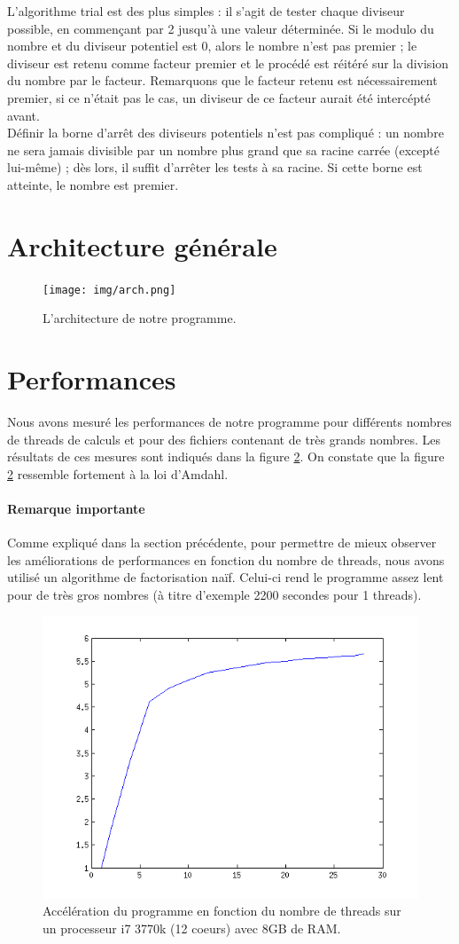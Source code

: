 \documentclass{article}
\begin{document}
L'algorithme trial est des plus simples : il s'agit de tester chaque diviseur possible, en commençant
par 2 jusqu'à une valeur déterminée. Si le modulo du nombre et du diviseur potentiel est 0, alors 
le nombre n'est pas premier ; le diviseur est retenu comme facteur premier et le procédé est réitéré
sur la division du nombre par le facteur. Remarquons que le facteur retenu est nécessairement premier,
si ce n'était pas le cas, un diviseur de ce facteur aurait été intercépté avant.\\

Définir la borne d'arrêt des diviseurs potentiels n'est pas compliqué : un nombre ne sera jamais 
divisible par un nombre plus grand que sa racine carrée (excepté lui-même) ; dès lors, il suffit
d'arrêter les tests à sa racine. Si cette borne est atteinte, le nombre est premier.

\section{Architecture générale}
\begin{figure}[ht]
	\centering
	\texttt{[image: img/arch.png]}
	\caption{L'architecture de notre programme.}
	\label{fig:arch}
\end{figure}

\section{Performances}
Nous avons mesuré les performances de notre programme pour différents nombres
de threads de calculs et pour des fichiers contenant de très grands nombres.
Les résultats de ces mesures sont indiqués dans la figure \ref{fig:speedup}.
On constate que la figure \ref{fig:speedup} ressemble fortement à la loi d'Amdahl.

\paragraph{Remarque importante}
Comme expliqué dans la section précédente, pour permettre de mieux observer
les améliorations de performances en fonction du nombre de threads, nous avons
utilisé un algorithme de factorisation naïf. Celui-ci rend le programme assez
lent pour de très gros nombres (à titre d'exemple 2200 secondes pour 1 threads).

\begin{figure}[ht]
	\centering
	\includegraphics[scale=0.8]{img/speedup.png}
	\caption{Accélération du programme en fonction du nombre de threads sur un processeur i7 3770k (12 coeurs)
	avec 8GB de RAM.}
	\label{fig:speedup}
\end{figure}
\end{document}
